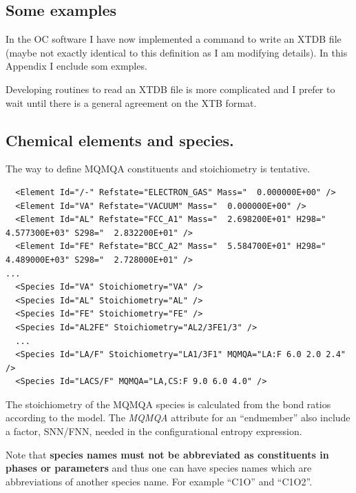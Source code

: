 \documentclass{article}
\begin{document}
\newpage
\begin{appendices}
\setcounter{equation}{0}
\renewcommand{\theequation}{A\arabic{equation}}
\setcounter{figure}{0}
\renewcommand{\thefigure}{A\arabic{figure}}

\section{Some examples}\label{sec:examples}

In the OC software I have now implemented a command to write an XTDB
file (maybe not exactly identical to this definition as I am modifying
details).  In this Appendix I enclude som exmples.

Developing routines to read an XTDB file is more complicated and I
prefer to wait until there is a general agreement on the XTB format.

\subsection{Chemical elements and species.}\label{sec:elementexample}

The way to define MQMQA constituents and stoichiometry is tentative.

{\small
\begin{verbatim}
  <Element Id="/-" Refstate="ELECTRON_GAS" Mass="  0.000000E+00" />
  <Element Id="VA" Refstate="VACUUM" Mass="  0.000000E+00" />
  <Element Id="AL" Refstate="FCC_A1" Mass="  2.698200E+01" H298="  4.577300E+03" S298="  2.832200E+01" />
  <Element Id="FE" Refstate="BCC_A2" Mass="  5.584700E+01" H298="  4.489000E+03" S298="  2.728000E+01" />
...
  <Species Id="VA" Stoichiometry="VA" />
  <Species Id="AL" Stoichiometry="AL" />
  <Species Id="FE" Stoichiometry="FE" />
  <Species Id="AL2FE" Stoichiometry="AL2/3FE1/3" />
  ...
  <Species Id="LA/F" Stoichiometry="LA1/3F1" MQMQA="LA:F 6.0 2.0 2.4" />
  <Species Id="LACS/F" MQMQA="LA,CS:F 9.0 6.0 4.0" />
\end{verbatim}
}

The stoichiometry of the MQMQA species is calculated from the bond
ratios according to the model.  The {\em MQMQA} attribute for an
``endmember'' also include a factor, SNN/FNN, needed in the
configurational entropy expression.

Note that {\bf species names must not be abbreviated as constituents in
  phases or parameters} and thus one can have species names which are
abbreviations of another species name.  For example ``C1O'' and
``C1O2''.


\end{appendices}
\end{document}
